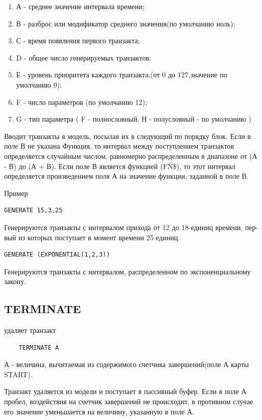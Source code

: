 \documentclass[14pt]{extarticle}
\begin{document}
\begin{enumerate}
	\item А - среднее значение интервала времени;
	\item В - разброс или модификатор среднего значения(по умолчанию ноль);
	\item С - время появления первого транзакта;
	\item D - общее число генерируемых транзактов;
	\item Е - уровень приоритета каждого транзакта;(от 0 до 127,значение по умолчанию 0);
	\item F - число параметров (по умолчанию 12);
	\item G - тип параметра ( F - полнословный, Н - полусловный - по умолчанию )
\end{enumerate}

Вводит транзакты в модель, посылая их в следующий по порядку блок. Если в поле В не указана Функция, то интервал между поступлением транзактов определяется случайным числом, равномерно распределенным в диапазоне от (А - В) до (А + В). Если поле В является функцией (FN\$), то этот интервал определяется произведением поля А на значение функции, заданной в поле В.

Пример

\begin{lstlisting}
GENERATE 15,3,25
\end{lstlisting}

Генерируются транзакты с интервалом прихода от 12 до 18 единиц времени, пер-вый из которых поступает в момент времени 25 единиц.

\begin{lstlisting}
GENERATE (EXPONENTIAL(1,2,3))
\end{lstlisting}

Генерируются транзакты с интервалом, распределенном по экспоненциальному закону.

\subsection*{TERMINATE}

удаляет транзакт

\begin{lstlisting}
	TERMINATE A
\end{lstlisting}

А - величина, вычитаемая из содержимого счетчика завершений(поле А карты START).

Транзакт удаляется из модели и поступает в пассивный буфер. Если в поле А пробел, воздействия на счетчик завершений не происходит, в противном случае его значение уменьшается на величину, указанную в поле А.
\end{document}

